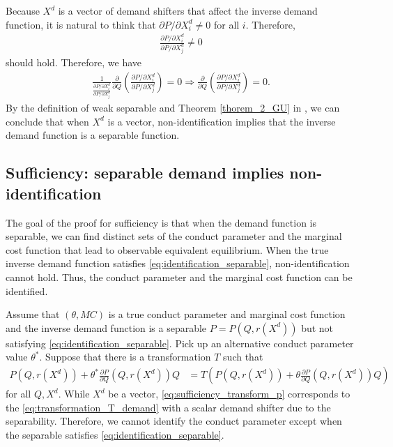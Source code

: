 \documentclass[11pt, a4paper]{article}
\theoremstyle{remark}
\begin{document}
Because $X^{d}$ is a vector of demand shifters that affect the inverse demand function, it is natural to think that $\partial P/\partial X^{d}_{i} \ne 0$ for all $i$.
Therefore, 
\begin{align}
    \frac{\partial P/\partial X^{d}_{i}}{\partial P/\partial X^{d}_{j}} \ne 0
\end{align}
should hold. 
Therefore, we have 
\begin{align}
     \frac{1}{\frac{\partial P/\partial X^{d}_{i}}{\partial P/\partial X^{d}_{j}}} \frac{\partial}{\partial Q} \left(\frac{\partial P/\partial X^{d}_{i}}{\partial P/\partial X^{d}_{j}}\right) = 0 \Longrightarrow \frac{\partial}{\partial Q} \left(\frac{\partial P/\partial X^{d}_{i}}{\partial P/\partial X^{d}_{j}}\right) = 0.
\end{align}
By the definition of weak separable and Theorem \ref{thorem_2_GU} in \citet{goldmanNote1964}, we can conclude that when $X^{d}$ is a vector, non-identification implies that the inverse demand function is a separable function.


\subsection{Sufficiency: separable demand implies non-identification}

The goal of the proof for sufficiency is that when the demand function is separable, we can find distinct sets of the conduct parameter and the marginal cost function that lead to observable equivalent equilibrium.
When the true inverse demand function satisfies \eqref{eq:identification_separable}, non-identification cannot hold.
Thus, the conduct parameter and the marginal cost function can be identified.

Assume that $(\theta, MC)$ is a true conduct parameter and marginal cost function and the inverse demand function is a separable $P = P(Q, r(X^{d}))$ but not satisfying  \eqref{eq:identification_separable}.
Pick up an alternative conduct parameter value $\theta^{*}$.
Suppose that there is a transformation $T$ such that
\begin{align}
    P(Q, r(X^d)) + \theta^{*}\frac{\partial P}{\partial Q}(Q, r(X^d)) Q 
    &= T\left(P(Q, r(X^d)) + \theta \frac{\partial P}{\partial Q}(Q, r(X^d)) Q\right) \label{eq:sufficiency_transform_p}
\end{align}
for all $Q, X^d$.
While $X^{d}$ be a vector, \eqref{eq:sufficiency_transform_p} corresponds to the \eqref{eq:transformation_T_demand} with a scalar demand shifter due to the separability.
Therefore, we cannot identify the conduct parameter except when the separable satisfies \eqref{eq:identification_separable}.
\end{document}
